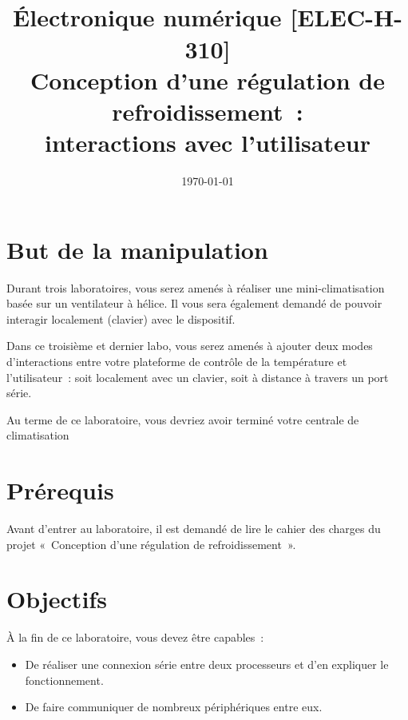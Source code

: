 \documentclass[11pt,a4paper]{article}
\date{\vspace{-1.7cm}\mydate\today}
\title{\vspace{-2cm}\labonumber\\ Électronique numérique [ELEC-H-310]\\Conception d'une régulation de refroidissement~: \\ interactions avec l'utilisateur\ifthenelse{\boolean{corrige}}{~\\Corrigé}{}}
\theoremstyle{definition}%
\begin{document}
\pagestyle{empty}
\maketitle





\section*{But de la manipulation}
Durant trois laboratoires, vous serez amenés à réaliser une mini-climatisation basée sur un ventilateur à hélice.
Il vous sera également demandé de pouvoir interagir localement (clavier) avec le dispositif.

Dans ce troisième et dernier labo, vous serez amenés à ajouter deux modes d’interactions entre votre plateforme de contrôle de la température et l’utilisateur~: soit localement avec un clavier, soit à distance à travers un port série.

Au terme de ce laboratoire, vous devriez avoir terminé votre centrale de climatisation


\section*{Prérequis}
Avant d’entrer au laboratoire, il est demandé de lire le cahier des charges du projet «~Conception d’une régulation de refroidissement~».


\section*{Objectifs}
À la fin de ce laboratoire, vous devez être capables~:
\begin{itemize}
	\item De réaliser une connexion série entre deux processeurs et d'en expliquer le fonctionnement.
	\item De faire communiquer de nombreux périphériques entre eux.
\end{itemize}


\newpage
\end{document}
